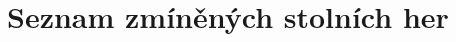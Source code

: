 \chapter{Seznam zmíněných stolních her}
\renewcommand{\glossarysection}[2][]{}
\printnoidxglossary[]
